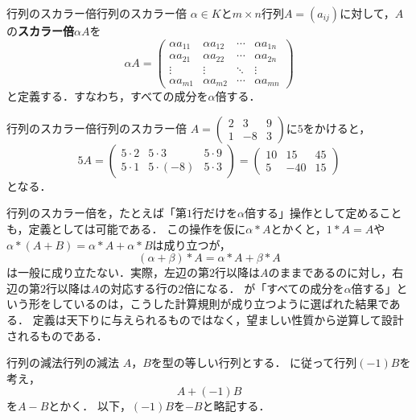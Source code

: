 \begin{definition}{行列のスカラー倍}{行列のスカラー倍}
  $\alpha \in K$と$m \times n$行列$A = (a_{ij})$に対して，$A$の\textbf{スカラー倍}$\alpha A$を
  \[
    \alpha A =
    \begin{pmatrix}
      \alpha a_{11} & \alpha a_{12} & \cdots & \alpha a_{1n} \\
      \alpha a_{21} & \alpha a_{22} & \cdots & \alpha a_{2n} \\
      \vdots & \vdots & \ddots & \vdots \\
      \alpha a_{m1} & \alpha a_{m2} & \cdots & \alpha a_{mn}
    \end{pmatrix}
  \]
  と定義する．すなわち，すべての成分を$\alpha$倍する．
\end{definition}


\begin{example}{行列のスカラー倍}{行列のスカラー倍}
  $A = \begin{pmatrix} 2 & 3 & 9 \\ 1 & -8 & 3 \end{pmatrix}$に$5$をかけると，
  \[
    5A =
    \begin{pmatrix}
      5 \cdot 2 & 5 \cdot 3 & 5 \cdot 9 \\
      5 \cdot 1 & 5 \cdot (-8) & 5 \cdot 3
    \end{pmatrix}
    =
    \begin{pmatrix}
      10 & 15 & 45 \\
      5 & -40 & 15
    \end{pmatrix}
  \]
  となる．
\end{example}

\begin{remark}[スカラー倍の定義の設計]
  行列のスカラー倍を，たとえば「第$1$行だけを$\alpha$倍する」操作として定めることも，定義としては可能である．
  この操作を仮に$\alpha \ast A$とかくと，$1 \ast A = A$や$\alpha \ast (A + B) = \alpha \ast A + \alpha \ast B$は成り立つが，
  \[
    (\alpha + \beta) \ast A = \alpha \ast A + \beta \ast A
  \]
  は一般に成り立たない．実際，左辺の第$2$行以降は$A$のままであるのに対し，右辺の第$2$行以降は$A$の対応する行の$2$倍になる．
  が「すべての成分を$\alpha$倍する」という形をしているのは，こうした計算規則が成り立つように選ばれた結果である．
  定義は天下りに与えられるものではなく，望ましい性質から逆算して設計されるものである．
\end{remark}

\begin{definition}{行列の減法}{行列の減法}
  $A$，$B$を型の等しい行列とする．
  に従って行列$(-1)B$を考え，
  \[
    A + (-1)B
  \]
  を$A - B$とかく．
  以下，$(-1)B$を$-B$と略記する．
\end{definition}

